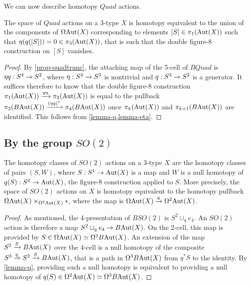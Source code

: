 \documentclass{amsart}
\begin{document}
We can now describe homotopy $Quad$ actions.

\begin{proposition} 
\label{prop-quadaction}
The space of $Quad$ actions on a 3-type $X$ is homotopy equivalent to the union of the components of $\Omega \mathrm{Aut}(X)$ corresponding to elements $[S] \in \pi_1(\mathrm{Aut}(X))$ such that $\eta(q([S])) = 0 \in \pi_3(\mathrm{Aut}(X))$, that is such that the double figure-8 construction on $[S]$ vanishes.
\end{proposition}
\begin{proof}
By \cref{prop-quadtrunc}, the attaching map of the 5-cell of $BQuad$ is $\eta q: S^4 \rightarrow S^2$, where $\eta : S^4 \rightarrow S^3$ is nontrivial and $q: S^3 \rightarrow S^2$ is a generator.  It suffices therefore to know that the double figure-8 construction $\pi_1(\mathrm{Aut}(X)) \xrightarrow{q \eta} \pi_3(\mathrm{Aut}(X))$ is equal to the pullback $\pi_2(B\mathrm{Aut}(X)) \xrightarrow{(\eta q)^\ast} \pi_4(B\mathrm{Aut}(X))$ once $\pi_{k}(\mathrm{Aut}(X))$ and $\pi_{k+1}(B\mathrm{Aut}(X))$ are identified.  This follows from \cref{lemma-q,lemma-eta}.
\end{proof}



\subsection{By the group $SO(2)$}

\begin{prop}[Actions by $SO(2)$] 
\label{prop-so2action}
The homotopy classes of $SO(2)$ actions on a 3-type $X$ are the homotopy classes of pairs $(S,W)$, where $S: S^1 \rightarrow \mathrm{Aut}(X)$ is a map and $W$ is a null homotopy of $q(S): S^2 \rightarrow \mathrm{Aut}(X)$, the figure-8 construction applied to $S$.  More precisely, the space of $SO(2)$ actions on $X$ is homotopy equivalent to the homotopy pullback $\Omega \mathrm{Aut}(X) \times_{\Omega^2 \mathrm{Aut}(X)} \ast$, where the map is $\Omega \mathrm{Aut}(X) \xrightarrow{q} \Omega^2 \mathrm{Aut}(X)$.
\end{prop}
\begin{proof}
As mentioned, the 4-presentation of $BSO(2)$ is $S^2 \cup_q e_4$.  An $SO(2)$ action is therefore a map $S^2 \cup_q e_4 \rightarrow B\mathrm{Aut}(X)$.  On the 2-cell, this map is provided by $S \in \Omega \mathrm{Aut}(X) \simeq \Omega^2 B\mathrm{Aut}(X)$.  An extension of the map $S^2 \xrightarrow{S} B\mathrm{Aut}(X)$ over the 4-cell is a null homotopy of the composite $S^3 \xrightarrow{q} S^2 \xrightarrow{S} B\mathrm{Aut}(X)$, that is a path in $\Omega^3 B\mathrm{Aut}(X)$ from $q^\ast S$ to the identity.  By \cref{lemma-q}, providing such a null homotopy is equivalent to providing a null homotopy of $q(S) \in \Omega^2\mathrm{Aut}(X) \simeq \Omega^3 B\mathrm{Aut}(X)$.
\end{proof}
\end{document}

